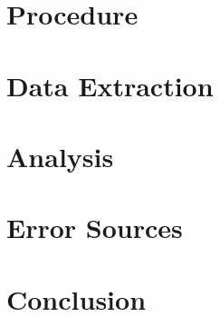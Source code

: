 \documentclass[12pt,a4paper]{article}
\begin{document}
\section{Procedure}
\vspace{1cm}
\section{Data Extraction}
\vspace{1cm}
\section{Analysis}
\vspace{1cm}
\section{Error Sources}
\vspace{1cm}
\section{Conclusion}
\end{document}
